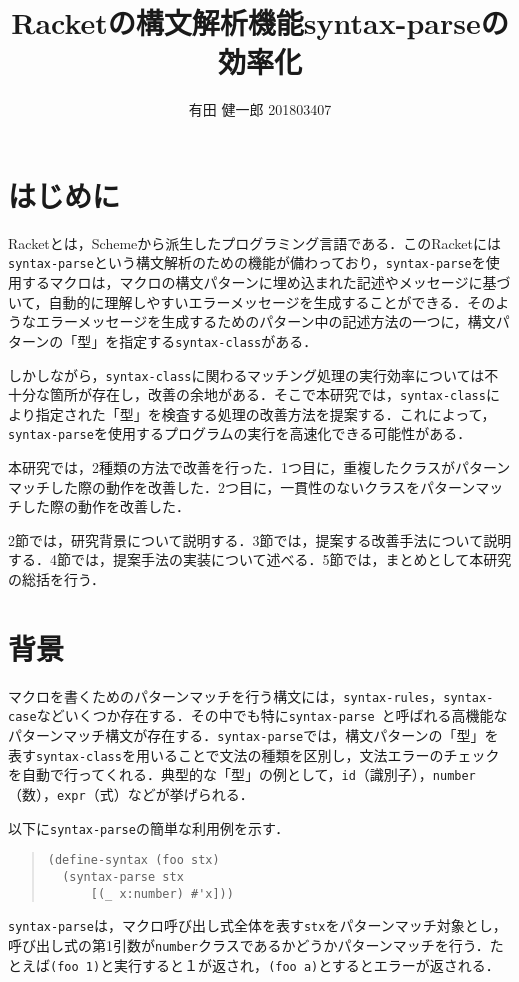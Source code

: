 \documentclass[twocolumn]{jsarticle}
\title{\textbf{Racketの構文解析機能syntax-parseの効率化}}
\author{有田 健一郎 201803407}
\date{} %
\begin{document}
\maketitle
\thispagestyle{fancy}
\setlength{\baselineskip}{16pt}
\section{はじめに}
Racketとは，Schemeから派生したプログラミング言語である．このRacketには\verb|syntax-parse|という構文解析のための機能が備わっており，\verb|syntax-parse|を使用するマクロは，マクロの構文パターンに埋め込まれた記述やメッセージに基づいて，自動的に理解しやすいエラーメッセージを生成することができる．そのようなエラーメッセージを生成するためのパターン中の記述方法の一つに，構文パターンの「型」を指定する\verb|syntax-class|がある．

しかしながら，\verb|syntax-class|に関わるマッチング処理の実行効率については不十分な箇所が存在し，改善の余地がある．そこで本研究では，\verb|syntax-class|により指定された「型」を検査する処理の改善方法を提案する．これによって，\verb|syntax-parse|を使用するプログラムの実行を高速化できる可能性がある．

本研究では，2種類の方法で改善を行った．1つ目に，重複したクラスがパターンマッチした際の動作を改善した．2つ目に，一貫性のないクラスをパターンマッチした際の動作を改善した．

2節では，研究背景について説明する．3節では，提案する改善手法について説明する．4節では，提案手法の実装について述べる．5節では，まとめとして本研究の総括を行う．

\section{背景}
マクロを書くためのパターンマッチを行う構文には，\verb|syntax-rules|，\verb|syntax-case|などいくつか存在する．その中でも特に\verb|syntax-parse|~\cite {racket-ref2}と呼ばれる高機能なパターンマッチ構文が存在する．\verb|syntax-parse|では，構文パターンの「型」を表す\verb|syntax-class|を用いることで文法の種類を区別し，文法エラーのチェックを自動で行ってくれる．典型的な「型」の例として，\verb|id|（識別子），\verb|number|（数），\verb|expr|（式）などが挙げられる．

以下に\verb|syntax-parse|の簡単な利用例を示す．
\begin{quote}
\setlength{\baselineskip}{11pt}
\begin{verbatim}
(define-syntax (foo stx)
  (syntax-parse stx
      [(_ x:number) #'x]))
\end{verbatim}
\end{quote}
\verb|syntax-parse|は，マクロ呼び出し式全体を表す\verb|stx|をパターンマッチ対象とし，呼び出し式の第1引数が\verb|number|クラスであるかどうかパターンマッチを行う．たとえば\verb|(foo 1)|と実行すると１が返され，\verb|(foo a)|とするとエラーが返される．
\end{document}
